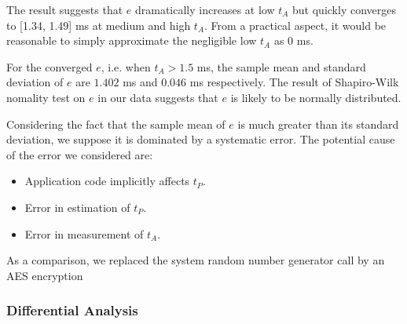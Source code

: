 The result suggests that $e$ dramatically increases at low $t_A$ but quickly converges to [1.34, 1.49] ms at medium and high $t_A$. From a practical aspect, it would be reasonable to simply approximate the negligible low $t_A$ as $0$ ms.

For the converged $e$, i.e. when $t_A > 1.5$ ms, the sample mean and standard deviation of $e$ are $1.402$ ms and $0.046$ ms respectively. The result of Shapiro-Wilk nomality test on $e$ in our data suggests that $e$ is likely to be normally  distributed. 

Considering the fact that the sample mean of $e$ is much greater than its standard deviation, we suppose it is dominated by a systematic error. The potential cause of the error we considered are:
\begin{itemize}
	\item Application code implicitly affects $t_P$.
	\item Error in estimation of $t_P$.
	\item Error in measurement of $t_A$.
\end{itemize}

As a comparison, we replaced the system random number generator call by an AES encryption

\subsubsection{Differential Analysis}


